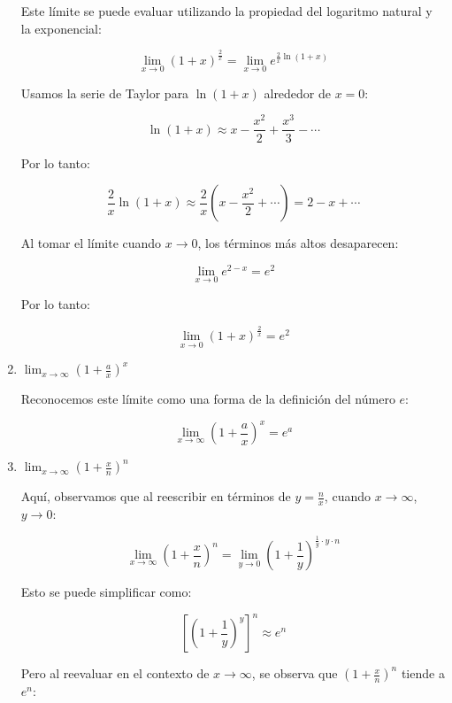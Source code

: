 \documentclass[answers]{exam} %
\begin{document}
\begin{questions}
\begin{solution}
\begin{enumerate}[label=\alph*.]
            Este límite se puede evaluar utilizando la propiedad del logaritmo natural y la exponencial:
    
            \[
            \lim_{x\to 0} (1+x)^{\frac{2}{x}} = \lim_{x\to 0} e^{\frac{2}{x} \ln(1+x)}
            \]
    
            Usamos la serie de Taylor para \(\ln(1+x)\) alrededor de \(x = 0\):
    
            \[
            \ln(1+x) \approx x - \frac{x^2}{2} + \frac{x^3}{3} - \cdots
            \]
    
            Por lo tanto:
    
            \[
            \frac{2}{x} \ln(1+x) \approx \frac{2}{x} \left( x - \frac{x^2}{2} + \cdots \right) = 2 - x + \cdots
            \]
    
            Al tomar el límite cuando \(x \to 0\), los términos más altos desaparecen:
    
            \[
            \lim_{x \to 0} e^{2 - x} = e^2
            \]
    
            Por lo tanto:
    
            \[
            \lim_{x\to 0} (1+x)^{\frac{2}{x}} = e^2
            \]
    
            \item \(\displaystyle \lim_{x\to{\infty}} \left(1+\frac{a}{x}\right)^{x}\)
    
            Reconocemos este límite como una forma de la definición del número \(e\):
    
            \[
            \lim_{x \to \infty} \left(1 + \frac{a}{x}\right)^x = e^a
            \]
    
            \item \(\displaystyle \lim_{x\to{\infty}} \left(1+\frac{x}{n}\right)^{n}\)
    
            Aquí, observamos que al reescribir en términos de \(y = \frac{n}{x}\), cuando \(x \to \infty\), \(y \to 0\):
    
            \[
            \lim_{x \to \infty} \left(1 + \frac{x}{n}\right)^n = \lim_{y \to 0} \left(1 + \frac{1}{y}\right)^{\frac{1}{y} \cdot y \cdot n}
            \]
    
            Esto se puede simplificar como:
    
            \[
            \left[\left(1 + \frac{1}{y}\right)^{y}\right]^n \approx e^n
            \]
    
            Pero al reevaluar en el contexto de \(x \to \infty\), se observa que \(\left(1 + \frac{x}{n}\right)^n\) tiende a \(e^{n}\):
    

\end{enumerate}
\end{solution}
\end{questions}
\end{document}
